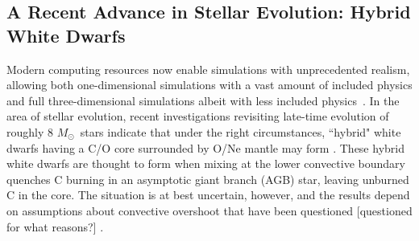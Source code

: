 \documentclass[iop,apj]{emulateapj}
\newcommand{\Msun}{\ensuremath{M_\odot}}
\begin{document}
%
%
%
%
%
%
%
%
%

\subsection{A Recent Advance in Stellar Evolution: Hybrid White Dwarfs}

Modern computing resources now enable simulations with unprecedented
realism, allowing both one-dimensional simulations with a vast
amount of included physics and full three-dimensional simulations
albeit with less included physics~\citep{caldertownsley2018}.
In the area of stellar evolution, recent investigations revisiting
late-time evolution of roughly 8 \Msun~stars indicate that under
the right circumstances, ``hybrid" white dwarfs having a C/O core surrounded by O/Ne
mantle may form \citep{siess2009,denissenkovetal2013}. These hybrid
white dwarfs are thought to form when mixing at the lower convective boundary quenches
C burning in an asymptotic giant branch (AGB) star, leaving unburned C
in the core. The situation is at best uncertain, however, and the
results depend on assumptions about convective
overshoot that have been questioned {\color{blue} [questioned for what reasons?]} \citep{chenetal2014,lecoanetetal16,lattanzioetal2017}.
\end{document}
